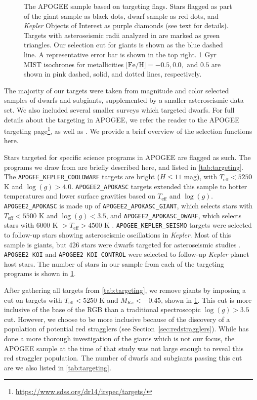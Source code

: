 \documentclass[preprint2]{aastex62}
\newcommand{\Kepler}{\mbox{\textit{Kepler}}}
\newcommand{\Teff}{\ensuremath{T_{\textrm{eff}}}}
\newcommand{\logg}{\ensuremath{\log(g)}}
\newcommand{\Ks}{\ensuremath{Ks}}
\newcommand{\MK}{\ensuremath{M_{\Ks}}}
\newcommand{\feh}{\textrm{[Fe/H]}}
\newcommand{\APOGEECOOLDWARF}{\texttt{APOGEE\_KEPLER\_COOLDWARF}}
\newcommand{\APOKASC}{\texttt{APOGEE2\_APOKASC}}
\newcommand{\APOKASCDWARF}{\texttt{APOGEE2\_APOKASC\_DWARF}}
\newcommand{\APOKASCGIANT}{\texttt{APOGEE2\_APOKASC\_GIANT}}
\newcommand{\APOGEEKOI}{\texttt{APOGEE2\_KOI}}
\newcommand{\APOGEEKOICONTROL}{\texttt{APOGEE2\_KOI\_CONTROL}}
\newcommand{\APOGEESEISMO}{\texttt{APOGEE\_KEPLER\_SEISMO}}
\begin{document}
\begin{figure}[htb]
  \centering
  \caption{The APOGEE sample based on targeting flags. Stars
      flagged as part of the giant sample as black dots, dwarf sample as red 
      dots, and \Kepler{} Objects of Interest as purple diamonds (see text for
      details). Targets with asteroseismic radii analyzed in 
      \citet{Serenelli17} are marked as green triangles. Our selection cut for
      giants is shown as the blue dashed line. A representative error 
      bar is shown in the top right. 1 Gyr MIST isochrones for metallicities 
      \(\feh = -0.5, 0.0, \textrm{ and } 0.5\) are shown in pink dashed, solid, 
      and dotted lines, respectively.\label{fig:targeting}}
\end{figure}

The majority of our targets were taken from magnitude and color selected 
samples of dwarfs and subgiants, supplemented by a smaller 
asteroseismic data set. We also included several
smaller surveys which targeted dwarfs. For full details about the targeting 
in APOGEE, we refer the reader to the APOGEE targeting 
page\footnote{\url{https://www.sdss.org/dr14/irspec/targets/}}, as well as 
\citet{Zasowski17}. We provide a brief overview of the selection functions here. 

Stars targeted for specific science programs in APOGEE are flagged as such. The programs we draw
from are briefly described here, and listed in \cref{tab:targeting}. The \APOGEECOOLDWARF{} targets are bright (\(H \le 11\) mag), with \citet{Pinsonneault12} \(\Teff < 5250\) K and \citet{Brown11} \(\logg > 4.0\). \APOKASC{} targets extended this sample to hotter temperatures and lower surface gravities based on \citet{Pinsonneault12} \Teff{} and \citet{Huber14} \logg{}. \APOKASC{} is made up of \APOKASCGIANT{}, which selects stars with \(\Teff < 5500\) K and \(\logg < 3.5\), and \APOKASCDWARF{}, which selects stars with \(6000 \textrm{ K } > \Teff > 4500 \textrm{ K }\). \APOGEESEISMO{} targets were selected to follow-up stars showing asteroseismic oscillations in \Kepler{}. Most of this sample is giants, but 426 stars were dwarfs targeted for asteroseismic studies \citep{Chaplin11}. \APOGEEKOI{} and \APOGEEKOICONTROL{} were selected to follow-up \Kepler{} planet host stars. The number of
stars in our sample from each of the targeting programs is shown in \cref{fig:targeting}.

After gathering all targets from \cref{tab:targeting}, we remove giants by
imposing a cut on targets with \(\Teff < 5250\) K and \(\MK < -0.45\), shown in
\cref{fig:targeting}. This cut is more inclusive of the base of the RGB than a traditional
spectroscopic \(\logg > 3.5\) cut. However, we choose to be more inclusive because of the discovery of a population of potential red stragglers (see Section~\ref{sec:redstragglers}). While  \citet{Tayar15} has done a more thorough investigation of the giants which is not our focus, the APOGEE sample at the time of that study was not large enough to reveal this red straggler population. The number of dwarfs and subgiants passing 
this cut are we also listed in \cref{tab:targeting}.
\end{document}

